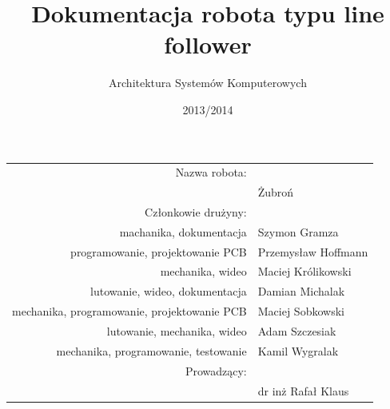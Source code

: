 \documentclass[11pt,a4paper]{article}
\author{Architektura Systemów Komputerowych}
\title{Dokumentacja robota typu line follower}
\date{2013/2014}
\begin{document}
\vspace{3cm}
\maketitle
\vspace{2cm}

\begin{center}
\begin{tabularx}{\linewidth}{rl}
  \hline
  Nazwa robota: & \\
  & Żubroń \\
  \hline 
  Członkowie drużyny: & \\
  machanika, dokumentacja & Szymon Gramza \\
  programowanie, projektowanie PCB & Przemysław Hoffmann \\
  mechanika, wideo & Maciej Królikowski \\
  lutowanie, wideo, dokumentacja & Damian Michalak \\
  mechanika, programowanie, projektowanie PCB & Maciej Sobkowski \\
  lutowanie, mechanika, wideo & Adam Szczesiak \\
  mechanika, programowanie, testowanie & Kamil Wygralak \\
  \hline
  Prowadzący: & \\
  & dr inż Rafał Klaus \\
  \hline
\end{tabularx} 
\end{center} %

\newpage
\tableofcontents
\newpage
\end{document}
